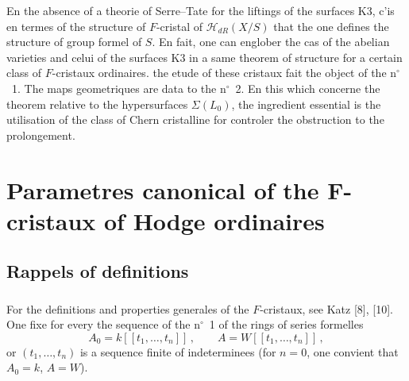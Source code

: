 \documentclass[12pt,a4paper]{article}
\theoremstyle{plain}
\theoremstyle{definition}
\theoremstyle{remark}
\begin{document}
En the absence of a theorie of Serre--Tate for the liftings of the surfaces K3, c'is en termes of the structure of $F$-cristal of $\mathcal{H}_{dR}(X/S)$ that the one defines the structure of group formel of $S$. En fait, one can englober the cas of the abelian varieties and celui of the surfaces K3 in a same theorem of structure for a certain class of $F$-cristaux ordinaires. the etude of these cristaux fait the object of the n$^\circ$\ 1. The maps geometriques are data to the n$^\circ$\ 2. En this which concerne the theorem relative to the hypersurfaces $\Sigma(L_0)$, the ingredient essential is the utilisation of the class of Chern cristalline for controler the obstruction to the prolongement.

\section{Parametres canonical of the F-cristaux of Hodge ordinaires}

\subsection{Rappels of definitions}

\subsubsection{}

For the definitions and properties generales of the $F$-cristaux, see Katz [8], [10]. One fixe for every the sequence of the n$^\circ$\ 1 of the rings of series formelles
\[
A_0 = k[[t_1, \ldots, t_n]]\,, \qquad A = W[[t_1, \ldots, t_n]]\,,
\]
or $(t_1, \ldots, t_n)$ is a sequence finite of indeterminees (for $n = 0$, one convient that $A_0 = k$, $A = W$).
\end{document}
